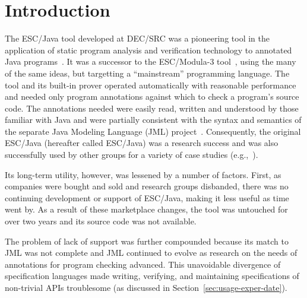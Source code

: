 \documentclass{llncs}
\begin{document}



\section{Introduction}

The ESC/Java tool developed at DEC/SRC was a pioneering tool in the
application of static program analysis and verification technology to
annotated Java programs~\cite{Flanagan-etal02}.  It was a successor to
the ESC/Modula-3 tool~\cite{ESCModula3}, using the many of the same
ideas, but targetting a ``mainstream'' programming language.  The tool
and its built-in prover operated automatically with reasonable
performance and needed only program annotations against which to check
a program's source code.  The annotations needed were easily read,
written and understood by those familiar with Java and were partially
consistent with the syntax and semantics of the separate Java Modeling
Language (JML) project~\cite{jmlpapers,Leavens-etal00}.  Consequently,
the original ESC/Java (hereafter called ESC/Java) was a research
success and was also successfully used by other groups for a variety
of case studies (e.g.,~\cite{Hub03,HOP04}).


Its long-term utility, however, was lessened by a number of factors.
First, as companies were bought and sold and research groups
disbanded, there was no continuing development or support of ESC/Java,
making it less useful as time went by.  As a result of these
marketplace changes, the tool was untouched for over two years and its
source code was not available.

The problem of lack of support was further compounded because its
match to JML was not complete and JML continued to evolve as research
on the needs of annotations for program checking advanced.  This
unavoidable divergence of specification languages made writing,
verifying, and maintaining specifications of non-trivial APIs
troublesome (as discussed in Section~\ref{sec:usage-exper-date}).
\end{document}

